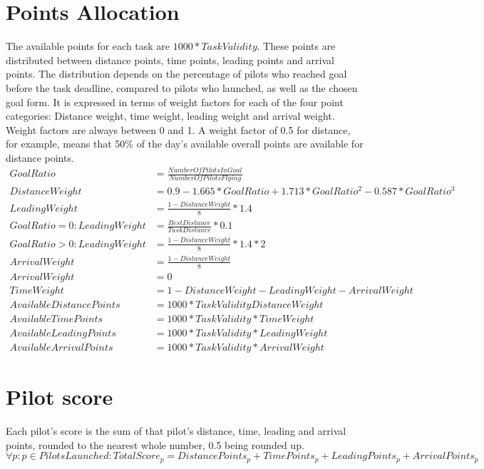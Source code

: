 \documentclass{article}
\begin{document}
\newpage
\section{Points Allocation}
The available points for each task are \(1000*TaskValidity\). These points are distributed between distance
points, time points, leading points and arrival points. The distribution depends on the percentage of
pilots who reached goal before the task deadline, compared to pilots who launched, as well as the
chosen goal form. It is expressed in terms of weight factors for each of the four point categories:
Distance weight, time weight, leading weight and arrival weight. Weight factors are always between 0
and 1. A weight factor of 0.5 for distance, for example, means that 50\% of the day’s available overall
points are available for distance points.
\begin{align*}
    GoalRatio &= \frac{NumberOfPilotsInGoal}{NumberOfPilotsFlying} \\
    DistanceWeight &= 0.9 - 1.665 * GoalRatio + 1.713 * GoalRatio^2 - 0.587 * GoalRatio^3 \\
    LeadingWeight &= \frac{1 - DistanceWeight}{8} * 1.4 \\
    GoalRatio = 0 : LeadingWeight &= \frac{BestDistance}{TaskDistance} * 0.1 \\
    GoalRatio > 0 : LeadingWeight &= \frac{1 - DistanceWeight}{8} * 1.4 * 2 \\
    ArrivalWeight &= \frac{1 - DistanceWeight}{8} \\
    ArrivalWeight &= 0 \\
    TimeWeight &= 1 - DistanceWeight - LeadingWeight - ArrivalWeight \\
    AvailableDistancePoints &= 1000 * TaskValidity  DistanceWeight \\
    AvailableTimePoints &= 1000 * TaskValidity * TimeWeight \\
    AvailableLeadingPoints &= 1000 * TaskValidity * LeadingWeight \\
    AvailableArrivalPoints &= 1000 * TaskValidity * ArrivalWeight
\end{align*}

\newpage
\section{Pilot score}
Each pilot’s score is the sum of that pilot’s distance, time, leading and arrival points, rounded to the
nearest whole number, 0.5 being rounded up.
\[ \forall p : p \in PilotsLaunched : TotalScore_p = DistancePoints_p + TimePoints_p + LeadingPoints_p + ArrivalPoints_p \]
\end{document}
